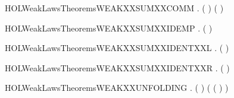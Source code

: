 \begin{SaveVerbatim}{HOLWeakLawsTheoremsWEAKXXSUMXXCOMM}
\HOLTokenTurnstile{} \HOLSymConst{\HOLTokenForall{}} .  ( \HOLSymConst{+} ) ( \HOLSymConst{+} )
\end{SaveVerbatim}
\newcommand{\HOLWeakLawsTheoremsWEAKXXSUMXXCOMM}{\UseVerbatim{HOLWeakLawsTheoremsWEAKXXSUMXXCOMM}}
\begin{SaveVerbatim}{HOLWeakLawsTheoremsWEAKXXSUMXXIDEMP}
\HOLTokenTurnstile{} \HOLSymConst{\HOLTokenForall{}}.  ( \HOLSymConst{+} ) 
\end{SaveVerbatim}
\newcommand{\HOLWeakLawsTheoremsWEAKXXSUMXXIDEMP}{\UseVerbatim{HOLWeakLawsTheoremsWEAKXXSUMXXIDEMP}}
\begin{SaveVerbatim}{HOLWeakLawsTheoremsWEAKXXSUMXXIDENTXXL}
\HOLTokenTurnstile{} \HOLSymConst{\HOLTokenForall{}}.  ( \HOLSymConst{+} ) 
\end{SaveVerbatim}
\newcommand{\HOLWeakLawsTheoremsWEAKXXSUMXXIDENTXXL}{\UseVerbatim{HOLWeakLawsTheoremsWEAKXXSUMXXIDENTXXL}}
\begin{SaveVerbatim}{HOLWeakLawsTheoremsWEAKXXSUMXXIDENTXXR}
\HOLTokenTurnstile{} \HOLSymConst{\HOLTokenForall{}}.  ( \HOLSymConst{+} ) 
\end{SaveVerbatim}
\newcommand{\HOLWeakLawsTheoremsWEAKXXSUMXXIDENTXXR}{\UseVerbatim{HOLWeakLawsTheoremsWEAKXXSUMXXIDENTXXR}}
\begin{SaveVerbatim}{HOLWeakLawsTheoremsWEAKXXUNFOLDING}
\HOLTokenTurnstile{} \HOLSymConst{\HOLTokenForall{}} .  (  ) (  (  ) )
\end{SaveVerbatim}
\newcommand{\HOLWeakLawsTheoremsWEAKXXUNFOLDING}{\UseVerbatim{HOLWeakLawsTheoremsWEAKXXUNFOLDING}}
